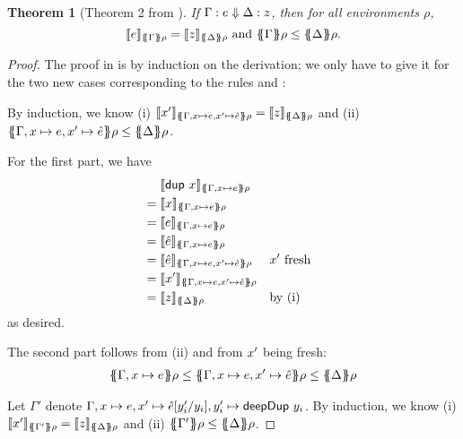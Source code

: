 \documentclass[preprint]{sigplanconf}
\newtheorem{theorem}{Theorem}
\theoremstyle{nonumberplain}
\newtheorem{proof}{Proof}
\begin{document}
\begin{theorem}[Theorem 2 from \citep{launchbury}]
If $\Gamma : e \Downarrow \Delta : z$, then for all environments $\rho$,
\[
\dsem e {\esem \Gamma \rho} = \dsem z {\esem \Delta \rho}
\text{ and }
\esem \Gamma \rho \le \esem \Delta \rho.
\]
\end{theorem}
\begin{proof}
The proof in \citep{launchbury} is by induction on the derivation; we only have to give it for the two new cases corresponding to the rules  and :

By induction, we know (i) $\dsem{\fresh x}{\esem{\Gamma, x \mapsto e, \fresh x \mapsto \hat e} \rho} = \dsem{z}{\esem \Delta \rho}$ and (ii) $\esem{\Gamma, x \mapsto e, \fresh x \mapsto \hat e} \rho \le \esem \Delta \rho$.

For the first part, we have 
\begin{align*}
&\phantom{{}={}}\dsem{\sDup x}{\esem{\Gamma, x\mapsto e}\rho}\\
&= \dsem{x}{\esem{\Gamma, x\mapsto e}\rho}\\
&= \dsem{e}{\esem{\Gamma, x\mapsto e}\rho}\\
&= \dsem{\hat e}{\esem{\Gamma, x\mapsto e}\rho}\\
&= \dsem{\hat e}{\esem{\Gamma, x\mapsto e, \fresh x \mapsto \hat e}\rho} && \text{$\fresh x$ fresh}\\
&= \dsem{\fresh x}{\esem{\Gamma, x\mapsto e, \fresh x \mapsto \hat e}\rho} \\
&= \dsem{z}{\esem \Delta \rho} &&\text{by (i)}
\end{align*}
as desired.

The second part follows from (ii) and from $x'$ being fresh:
\begin{align*}
\esem{\Gamma, x\mapsto e}\rho \le \esem{\Gamma, x\mapsto e, \fresh x\mapsto \hat e} \rho \le \esem{\Delta}\rho
\end{align*}

Let \mbox{$\Gamma'$} denote {$\Gamma, x\mapsto e, x'\mapsto \hat e[y'_i/y_i], y'_i \mapsto \text{\textsf{deepDup}}\ y_i$}.
By induction, we know (i) $\dsem{\fresh x}{\esem{\Gamma'} \rho} = \dsem{z}{\esem \Delta \rho}$ and (ii) $\esem{\Gamma'} \rho \le \esem \Delta \rho$.


\end{proof}
\end{document}
